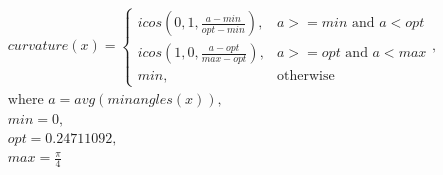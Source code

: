 \begin{equation}
\label{eq:curvature}
\begin{aligned}
    curvature(x) =
    \begin{cases}
        icos(0, 1, \frac{a - min}{opt - min}), & a >= min \text{ and } a < opt \\
        icos(1, 0, \frac{a - opt}{max - opt}), & a >= opt \text{ and } a < max \\
        min, & \text{otherwise}
    \end{cases}, \\
    \text{where } a = avg(minangles(x)), \\
    min = 0, \\
    opt = 0.24711092, \\
    max = \frac{\pi}{4} \\
\end{aligned}
\end{equation}
